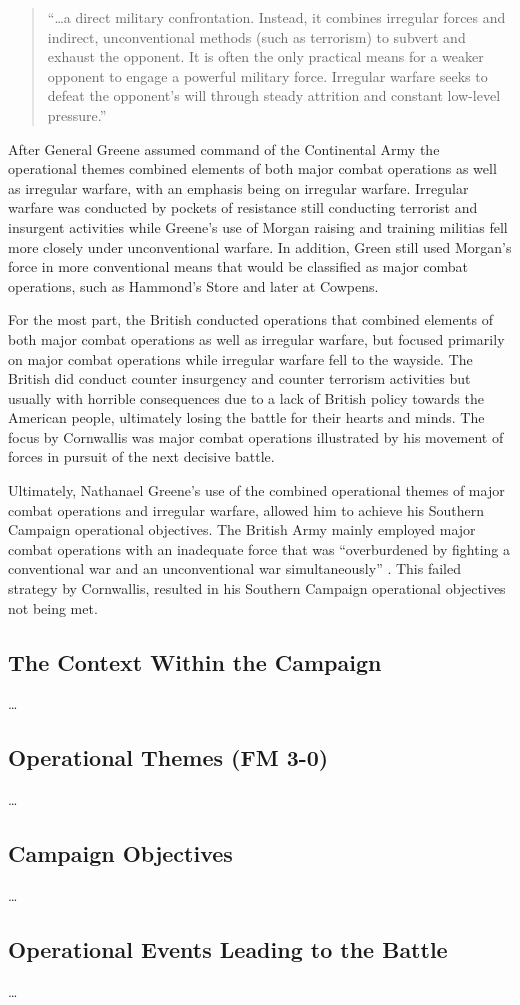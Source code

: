 \begin{quote} “…a direct military confrontation. Instead, it combines irregular
  forces and indirect, unconventional methods (such as terrorism) to subvert and
  exhaust the opponent. It is often the only practical means for a weaker
  opponent to engage a powerful military force. Irregular warfare seeks to
  defeat the opponent’s will through steady attrition and constant low-level
  pressure.” \end{quote}

After General Greene assumed command of the Continental Army the operational
themes combined elements of both major combat operations as well as irregular
warfare, with an emphasis being on irregular warfare.  Irregular warfare was
conducted by pockets of resistance still conducting terrorist and insurgent
activities while Greene’s use of Morgan raising and training militias fell more
closely under unconventional warfare.  In addition, Green still used Morgan’s
force in more conventional means that would be classified as major combat
operations, such as Hammond’s Store and later at Cowpens.

For the most part, the British conducted operations that combined elements of
both major combat operations as well as irregular warfare, but focused primarily
on major combat operations while irregular warfare fell to the wayside.  The
British did conduct counter insurgency and counter terrorism activities but
usually with horrible consequences due to a lack of British policy towards the
American people, ultimately losing the battle for their hearts and minds.  The
focus by Cornwallis was major combat operations illustrated by his movement of
forces in pursuit of the next decisive battle.  

Ultimately, Nathanael Greene’s use of the combined operational themes of major
combat operations and irregular warfare, allowed him to achieve his Southern
Campaign operational objectives.  The British Army mainly employed major combat
operations with an inadequate force that was “overburdened by fighting a
conventional war and an unconventional war simultaneously” \cite[55]{woodward_comparative_2002}.  This
failed strategy by Cornwallis, resulted in his Southern Campaign operational
objectives not being met.

\subsection{The Context Within the Campaign}


\ldots

\subsection{Operational Themes (FM 3-0)}

\ldots

\subsection{Campaign Objectives}

\ldots

\subsection{Operational Events Leading to the Battle}

\ldots





